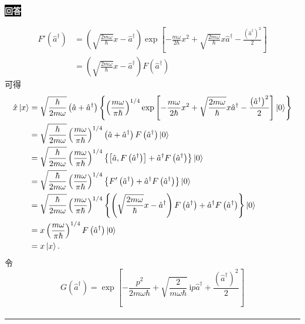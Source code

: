 \documentclass[11pt,a4paper]{ctexart}
\newenvironment{answer}
  {\par\smallskip\noindent
   \begingroup
   \setlength{\fboxsep}{4pt}%
   \colorbox{black}{\textcolor{white}{\bfseries 回答}}%
   \endgroup
   \quad\ignorespaces}
  {\par\smallskip\noindent\rule{\linewidth}{0.4pt}\medskip}
\begin{document}
\begin{answer}
\begin{enumerate}
\begin{equation}
\begin{aligned}
        F'\left(\hat{a}^\dag \right)
      &=\left(\sqrt{\frac{2m\omega }{\hbar } }x - \hat{a}^\dag \right)\exp\left[-\frac{m\omega}{2\hbar}x^2+\sqrt{\frac{2m\omega}{\hbar}}x\hat a^\dagger-\frac{\left(\hat a^\dagger\right)^2}{2}\right] \\
      &=\left(\sqrt{\frac{2m\omega }{\hbar } }x - \hat{a}^\dag \right) F\left(\hat{a}^\dag \right)
      \end{aligned}
    \end{equation}
    可得
    \begin{equation}
      \begin{aligned}
        \hat{x} \Ket{x }
        &=\sqrt{\frac{\hbar }{2m\omega } } \left(\hat{a}+\hat{a}^\dag \right) \left\{\left(\frac{m\omega}{\pi\hbar}\right)^{1/4}\exp\left[-\frac{m\omega}{2\hbar}x^2+\sqrt{\frac{2m\omega}{\hbar}}x\hat a^\dagger-\frac{\left(\hat a^\dagger\right)^2}{2}\right]\Ket{0} \right\} \\
        &=\sqrt{\frac{\hbar }{2m\omega } }\left(\frac{m\omega}{\pi\hbar}\right)^{1/4} \left(\hat{a}+\hat{a}^\dag \right) F\left(\hat{a}^\dag \right) \Ket{0 } \\
        &=\sqrt{\frac{\hbar }{2m\omega } }\left(\frac{m\omega}{\pi\hbar}\right)^{1/4} \left\{\left[\hat{a},F\left(\hat{a}^\dag \right) \right]+\hat{a}^\dag F\left(\hat{a}^\dag \right) \right\} \Ket{0 } \\
        &=\sqrt{\frac{\hbar }{2m\omega } }\left(\frac{m\omega}{\pi\hbar}\right)^{1/4} \left\{F'\left(\hat{a}^\dag \right)+\hat{a}^\dag F\left(\hat{a}^\dag \right) \right\} \Ket{0 } \\
        &=\sqrt{\frac{\hbar }{2m\omega } }\left(\frac{m\omega}{\pi\hbar}\right)^{1/4} \left\{\left(\sqrt{\frac{2m\omega }{\hbar } }x - \hat{a}^\dag \right) F\left(\hat{a}^\dag \right)+\hat{a}^\dag F\left(\hat{a}^\dag \right) \right\} \Ket{0 } \\
        &=x \left(\frac{m\omega}{\pi\hbar}\right)^{1/4} F\left(\hat{a}^\dag \right) \Ket{0 } \\
        &=x\Ket{x }.
      \end{aligned}
    \end{equation}
    令
    \begin{equation}
      G\left(\hat{a}^\dag \right)
      =\exp\left[-\frac{p^2}{2m\omega\hbar}+\sqrt{\frac{2}{m\omega\hbar}}\,\mathrm{i}p\hat a^\dagger+\frac{\left(\hat a^\dagger\right)^2}{2}\right]
    \end{equation}
    \begin{equation}
      \begin{aligned}

\end{aligned}
\end{equation}
\end{enumerate}
\end{answer}
\end{document}
